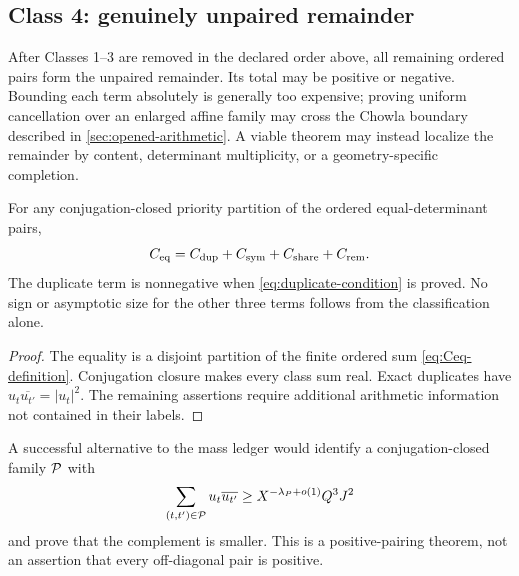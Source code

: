 \subsection{Class 4: genuinely unpaired remainder}

After Classes 1--3 are removed in the declared order above, all
remaining ordered pairs form the unpaired remainder.  Its total may
be positive or negative.  Bounding each term absolutely is generally
too expensive; proving uniform cancellation over an enlarged affine
family may cross the Chowla boundary described in
\cref{sec:opened-arithmetic}.  A viable theorem may instead localize
the remainder by content, determinant multiplicity, or a
geometry-specific completion.

\begin{proposition}
\label{prop:classification-scope}
For any conjugation-closed priority partition of the ordered
equal-determinant pairs,
\begin{equation}
 C_{\mathrm{eq}}
 =C_{\rm dup}+C_{\rm sym}+C_{\rm share}+C_{\rm rem}.
\label{eq:Ceq-class-sum}
\end{equation}
The duplicate term is nonnegative when
\eqref{eq:duplicate-condition} is proved.  No sign or asymptotic size
for the other three terms follows from the classification alone.
\end{proposition}

\begin{proof}
The equality is a disjoint partition of the finite ordered sum
\eqref{eq:Ceq-definition}.  Conjugation closure makes every class
sum real.  Exact duplicates have
\(u_t\overline{u_{t'}}=|u_t|^2\).  The remaining assertions require
additional arithmetic information not contained in their labels.
\end{proof}

\begin{remark}
A successful alternative to the mass ledger would identify a
conjugation-closed family \(\mathcal P\) with
\[
 \sum_{(t,t')\in\mathcal P}
 u_t\overline{u_{t'}}
 \ge X^{-\lambda_P+o(1)}Q^3J^2
\]
and prove that the complement is smaller.  This is a positive-pairing
theorem, not an assertion that every off-diagonal pair is positive.
\end{remark}
